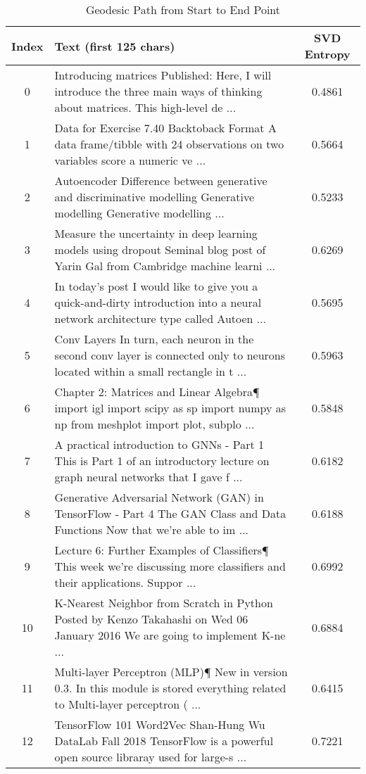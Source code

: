 \begin{table}[htbp]
\caption{Geodesic Path from Start to End Point}
\label{tab:geodesic_path}
\begin{tabular}{|c|p{12cm}|c|}
\toprule
Index & Text (first 125 chars) & SVD Entropy \\
\midrule
0 &  Introducing matrices  Published:  Here, I will introduce the three main ways of thinking about matrices. This high-level de ... & 0.4861 \\
1 & Data for Exercise 7.40  Backtoback   Format  A data frame/tibble with 24 observations on two variables  score  a numeric ve ... & 0.5664 \\
2 &  Autoencoder   Difference between generative and discriminative modelling   Generative modelling  Generative modelling  ... & 0.5233 \\
3 &  Measure the uncertainty in deep learning models using dropout  Seminal blog post of Yarin Gal from Cambridge machine learni ... & 0.6269 \\
4 & In today’s post I would like to give you a quick-and-dirty introduction into a neural network architecture type called Autoen ... & 0.5695 \\
5 & Conv Layers  In turn, each neuron in the second conv layer is connected only to neurons located within a small rectangle in t ... & 0.5963 \\
6 &  Chapter 2: Matrices and Linear Algebra¶  import igl import scipy as sp import numpy as np from meshplot import plot, subplo ... & 0.5848 \\
7 &  A practical introduction to GNNs - Part 1  This is Part 1 of an introductory lecture on graph neural networks that I gave f ... & 0.6182 \\
8 &  Generative Adversarial Network (GAN) in TensorFlow - Part 4   The GAN Class and Data Functions  Now that we’re able to im ... & 0.6188 \\
9 &  Lecture 6: Further Examples of Classifiers¶  This week we're discussing more classifiers and their applications.   Suppor ... & 0.6992 \\
10 &  K-Nearest Neighbor from Scratch in Python  Posted by Kenzo Takahashi on Wed 06 January 2016  We are going to implement K-ne ... & 0.6884 \\
11 &  Multi-layer Perceptron (MLP)¶  New in version 0.3.  In this module is stored everything related to Multi-layer perceptron ( ... & 0.6415 \\
12 &  TensorFlow 101  Word2Vec  Shan-Hung Wu  DataLab Fall 2018  TensorFlow is a powerful open source libraray used for large-s ... & 0.7221 \\

\end{tabular}
\end{table}
